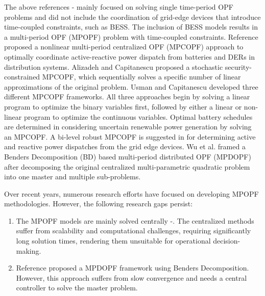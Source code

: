 The above references \cite{Wei}-\cite{Paul2} mainly focused on solving single time-period OPF problems and did not include the coordination of grid-edge devices that introduce time-coupled constraints, such as BESS. The inclusion of BESS models results in a multi-period OPF (MPOPF) problem with time-coupled constraints. Reference \cite{Gabash} proposed a nonlinear multi-period centralized OPF (MPCOPF) approach to optimally coordinate active-reactive power dispatch from batteries and DERs in distribution systems. Alizadeh and Capitanescu \cite{Alizadeh} proposed a stochastic security-constrained MPCOPF, which sequentially solves a specific number of linear approximations of the original problem. Usman and Capitanescu \cite{Usman} developed three different MPCOPF frameworks. All three approaches begin by solving a linear program to optimize the binary variables first, followed by either a linear or non-linear program to optimize the continuous variables. Optimal battery schedules are determined in \cite{Aghdam} considering uncertain renewable power generation by solving an MPCOPF. A bi-level robust MPCOPF is suggested in \cite{Zhang1} for determining active and reactive power dispatches from the grid edge devices. Wu et al. \cite{Wu} framed a Benders Decomposition (BD) based multi-period distributed OPF (MPDOPF) after decomposing the original centralized multi-parametric quadratic problem into one master and multiple sub-problems. 

Over recent years, numerous research efforts have focused on developing MPOPF methodologies. However, the following research gaps persist:
\begin{enumerate}
    \item The MPOPF models are mainly solved centrally \cite{Gabash}-\cite{Zhang1}. The centralized methods suffer from scalability and computational challenges, requiring significantly long solution times, rendering them unsuitable for operational decision-making.
    \item Reference \cite{Wu} proposed a MPDOPF framework using Benders Decomposition. However, this approach suffers from slow convergence and needs a central controller to solve the master problem. 
\end{enumerate}

